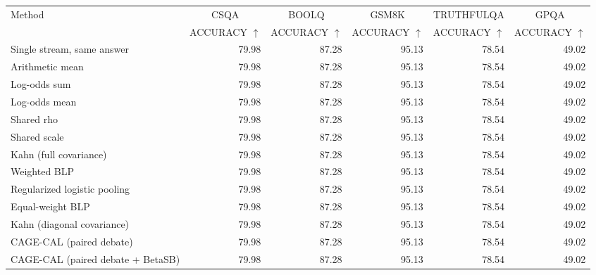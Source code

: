 \begin{tabular}{lrrrrr}
\toprule
Method & \multicolumn{1}{c}{CSQA} & \multicolumn{1}{c}{BOOLQ} & \multicolumn{1}{c}{GSM8K} & \multicolumn{1}{c}{TRUTHFULQA} & \multicolumn{1}{c}{GPQA} \\
 & ACCURACY $\uparrow$ & ACCURACY $\uparrow$ & ACCURACY $\uparrow$ & ACCURACY $\uparrow$ & ACCURACY $\uparrow$ \\
\midrule
Single stream, same answer & 79.98 & 87.28 & 95.13 & 78.54 & 49.02 \\
Arithmetic mean & 79.98 & 87.28 & 95.13 & 78.54 & 49.02 \\
Log-odds sum & 79.98 & 87.28 & 95.13 & 78.54 & 49.02 \\
Log-odds mean & 79.98 & 87.28 & 95.13 & 78.54 & 49.02 \\
Shared rho & 79.98 & 87.28 & 95.13 & 78.54 & 49.02 \\
Shared scale & 79.98 & 87.28 & 95.13 & 78.54 & 49.02 \\
Kahn (full covariance) & 79.98 & 87.28 & 95.13 & 78.54 & 49.02 \\
Weighted BLP & 79.98 & 87.28 & 95.13 & 78.54 & 49.02 \\
Regularized logistic pooling & 79.98 & 87.28 & 95.13 & 78.54 & 49.02 \\
Equal-weight BLP & 79.98 & 87.28 & 95.13 & 78.54 & 49.02 \\
Kahn (diagonal covariance) & 79.98 & 87.28 & 95.13 & 78.54 & 49.02 \\
CAGE-CAL (paired debate) & 79.98 & 87.28 & 95.13 & 78.54 & 49.02 \\
CAGE-CAL (paired debate + BetaSB) & 79.98 & 87.28 & 95.13 & 78.54 & 49.02 \\
\bottomrule
\end{tabular}
